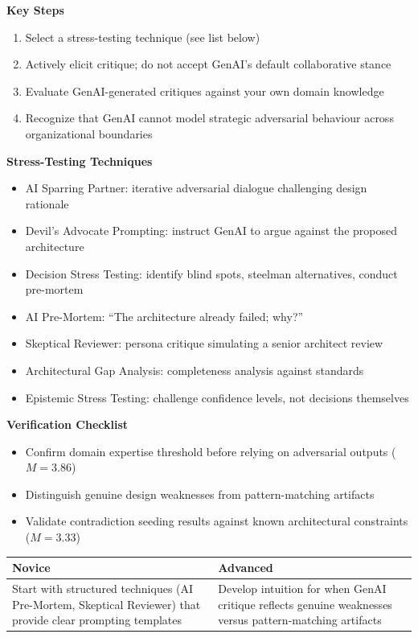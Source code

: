 \textbf{Key Steps}
\begin{enumerate}
    \item Select a stress-testing technique (see list below)
    \item Actively elicit critique; do not accept GenAI's default collaborative stance
    \item Evaluate GenAI-generated critiques against your own domain knowledge
    \item Recognize that GenAI cannot model strategic adversarial behaviour across organizational boundaries
\end{enumerate}

\textbf{Stress-Testing Techniques}
\begin{itemize}
    \item AI Sparring Partner: iterative adversarial dialogue challenging design rationale
    \item Devil's Advocate Prompting: instruct GenAI to argue against the proposed architecture
    \item Decision Stress Testing: identify blind spots, steelman alternatives, conduct pre-mortem
    \item AI Pre-Mortem: ``The architecture already failed; why?''
    \item Skeptical Reviewer: persona critique simulating a senior architect review
    \item Architectural Gap Analysis: completeness analysis against standards
    \item Epistemic Stress Testing: challenge confidence levels, not decisions themselves
\end{itemize}

\textbf{Verification Checklist}
\begin{itemize}[label=\checkbox]
    \item Confirm domain expertise threshold before relying on adversarial outputs ($M = 3.86$)
    \item Distinguish genuine design weaknesses from pattern-matching artifacts
    \item Validate contradiction seeding results against known architectural constraints ($M = 3.33$)
\end{itemize}

\begin{tabular}{|p{6.5cm}|p{6.5cm}|}
    \hline
    \textbf{Novice} & \textbf{Advanced} \\
    \hline
    Start with structured techniques (AI Pre-Mortem, Skeptical Reviewer) that provide clear prompting templates & Develop intuition for when GenAI critique reflects genuine weaknesses versus pattern-matching artifacts \\
    \hline
\end{tabular}

